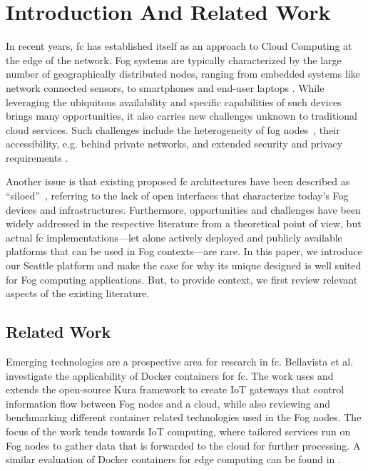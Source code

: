 \section{Introduction And Related Work}

In recent years, \gls{fc} has established itself as an approach to
Cloud Computing at the edge of the network. Fog systems are typically
characterized by the large number of geographically distributed
nodes, ranging from embedded systems like network connected
sensors, to smartphones and end-user laptops
\cite{Bonomi:2012:FCR:2342509.2342513,Yi:2015:SFC:2757384.2757397,dastjerdi_fog_2016}.
While leveraging the
ubiquitous availability and specific capabilities of such devices brings
many opportunities, it also carries new challenges unknown to traditional cloud
services. Such challenges include the heterogeneity of fog
nodes~\cite{Bonomi:2012:FCR:2342509.2342513,7868354,Yi:2015:SFC:2757384.2757397,mahmud_fog_2016},
their accessibility, e.g. behind private networks, and extended security and
privacy requirements \cite{botta_integration_2016}.

Another issue is that existing proposed \gls{fc} architectures have been described
as ``siloed''~\cite{belli_design_2015}, referring to the lack of
open interfaces that characterize today's Fog devices and infrastructures.
Furthermore, opportunities and challenges have been widely addressed in the
respective literature from a theoretical point of view, but actual \gls{fc}
implementations—let alone actively deployed and
publicly available platforms that can be used in Fog contexts—are rare.
In this paper, we introduce our Seattle platform and make the case for why its
unique designed is well suited for Fog computing applications. But,
to provide context, we first review relevant aspects of the existing
literature.

\subsection{Related Work}

Emerging technologies are a prospective area for research in \gls{fc}.
Bellavista et al.~\cite{bellavista_feasibility_2017} investigate the
applicability of Docker containers for \gls{fc}. The work uses and extends
the open-source Kura framework to create \gls{IoT} gateways that control information
flow between Fog nodes and a cloud, while also reviewing and benchmarking
different container related technologies used in the Fog nodes.
The focus of the work tends towards \gls{IoT} computing, where tailored services run
on Fog nodes to gather data that is forwarded to the cloud for further processing.
A similar evaluation of Docker containers for edge computing can be found in
\cite{ismail_evaluation_2015}.

